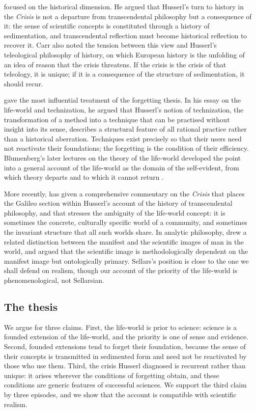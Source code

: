 \documentclass{situationist-preprint}
\begin{document}
\citet{Carr1974} focused on the historical dimension. He argued that Husserl's turn to history in the \emph{Crisis} is not a departure from transcendental philosophy but a consequence of it: the sense of scientific concepts is constituted through a history of sedimentation, and transcendental reflection must become historical reflection to recover it. Carr also noted the tension between this view and Husserl's teleological philosophy of history, on which European history is the unfolding of an idea of reason that the crisis threatens. If the crisis is the crisis of that teleology, it is unique; if it is a consequence of the structure of sedimentation, it should recur.

\citet{Blumenberg1981} gave the most influential treatment of the forgetting thesis. In his essay on the life-world and technization, he argued that Husserl's notion of technization, the transformation of a method into a technique that can be practised without insight into its sense, describes a structural feature of all rational practice rather than a historical aberration. Techniques exist precisely so that their users need not reactivate their foundations; the forgetting is the condition of their efficiency. Blumenberg's later lectures on the theory of the life-world developed the point into a general account of the life-world as the domain of the self-evident, from which theory departs and to which it cannot return \citep{Blumenberg2010}.

More recently, \citet{Moran2012} has given a comprehensive commentary on the \emph{Crisis} that places the Galileo section within Husserl's account of the history of transcendental philosophy, and that stresses the ambiguity of the life-world concept: it is sometimes the concrete, culturally specific world of a community, and sometimes the invariant structure that all such worlds share. In analytic philosophy, \citet{Sellars1962} drew a related distinction between the manifest and the scientific images of man in the world, and argued that the scientific image is methodologically dependent on the manifest image but ontologically primary. Sellars's position is close to the one we shall defend on realism, though our account of the priority of the life-world is phenomenological, not Sellarsian.

\subsection{The thesis}

We argue for three claims. First, the life-world is prior to science: science is a founded extension of the life-world, and the priority is one of sense and evidence. Second, founded extensions tend to forget their foundation, because the sense of their concepts is transmitted in sedimented form and need not be reactivated by those who use them. Third, the crisis Husserl diagnosed is recurrent rather than unique: it arises wherever the conditions of forgetting obtain, and these conditions are generic features of successful sciences. We support the third claim by three episodes, and we show that the account is compatible with scientific realism.
\end{document}
